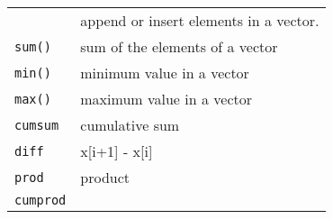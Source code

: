 \documentclass[11pt]{article}
\begin{document}
\begin{longtable}[c]{@{}ll@{}}
\begin{minipage}[t]{0.13\columnwidth}
\strut\end{minipage} &
\begin{minipage}[t]{0.81\columnwidth}\raggedright\strut
append or insert elements in a vector.
\strut\end{minipage}\tabularnewline
\begin{minipage}[t]{0.13\columnwidth}\raggedright\strut
\texttt{sum()}
\strut\end{minipage} &
\begin{minipage}[t]{0.81\columnwidth}\raggedright\strut
sum of the elements of a vector
\strut\end{minipage}\tabularnewline
\begin{minipage}[t]{0.13\columnwidth}\raggedright\strut
\texttt{min()}
\strut\end{minipage} &
\begin{minipage}[t]{0.81\columnwidth}\raggedright\strut
minimum value in a vector
\strut\end{minipage}\tabularnewline
\begin{minipage}[t]{0.13\columnwidth}\raggedright\strut
\texttt{max()}
\strut\end{minipage} &
\begin{minipage}[t]{0.81\columnwidth}\raggedright\strut
maximum value in a vector
\strut\end{minipage}\tabularnewline
\begin{minipage}[t]{0.13\columnwidth}\raggedright\strut
\texttt{cumsum}
\strut\end{minipage} &
\begin{minipage}[t]{0.81\columnwidth}\raggedright\strut
cumulative sum
\strut\end{minipage}\tabularnewline
\begin{minipage}[t]{0.13\columnwidth}\raggedright\strut
\texttt{diff}
\strut\end{minipage} &
\begin{minipage}[t]{0.81\columnwidth}\raggedright\strut
x{[}i+1{]} - x{[}i{]}
\strut\end{minipage}\tabularnewline
\begin{minipage}[t]{0.13\columnwidth}\raggedright\strut
\texttt{prod}
\strut\end{minipage} &
\begin{minipage}[t]{0.81\columnwidth}\raggedright\strut
product
\strut\end{minipage}\tabularnewline
\begin{minipage}[t]{0.13\columnwidth}\raggedright\strut
\texttt{cumprod}
\strut\end{minipage} &

\end{longtable}
\end{document}
